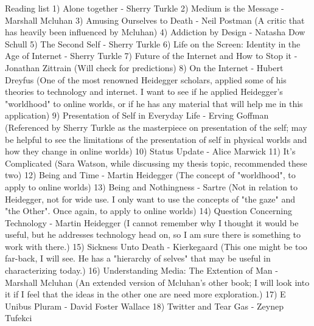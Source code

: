 Reading list
1) Alone together - Sherry Turkle
2) Medium is the Message - Marshall Mcluhan
3) Amusing Ourselves to Death - Neil Postman (A critic that has heavily been influenced by Mcluhan)
4) Addiction by Design - Natasha Dow Schull
5) The Second Self - Sherry Turkle
6) Life on the Screen: Identity in the Age of Internet - Sherry Turkle
7) Future of the Internet and How to Stop it - Jonathan Zittrain (Will check for predictions)
8) On the Internet - Hubert Dreyfus (One of the most renowned Heidegger scholars, applied some of his theories to technology and internet. 
I want to see if he applied Heidegger's "worldhood" to online worlds, or if he has any material that will help me in this application)
9) Presentation of Self in Everyday Life - Erving Goffman (Referenced by Sherry Turkle as the masterpiece on presentation of the self; may
be helpful to see the limitations of the presentation of self in physical worlds and how they change in online worlds)
10) Status Update - Alice Marwick
11) It's Complicated (Sara Watson, while discussing my thesis topic, recommended these two)
12) Being and Time - Martin Heidegger (The concept of "worldhood", to apply to online worlds)
13) Being and Nothingness - Sartre (Not in relation to Heidegger, not for wide use. I only want to use the concepts of "the gaze" and 
"the Other". Once again, to apply to online worlds)
14) Question Concerning Technology - Martin Heidegger (I cannot remember why I thought it would be useful, but he addresses technology head on,
so I am sure there is something to work with there.)
15) Sickness Unto Death - Kierkegaard (This one might be too far-back, I will see. He has a "hierarchy of selves" that may be useful in
characterizing today.)
16) Understanding Media: The Extention of Man - Marshall Mcluhan (An extended version of Mcluhan's other book; I will look into it if 
I feel that the ideas in the other one are need more exploration.)
17) E Unibus Pluram - David Foster Wallace
18) Twitter and Tear Gas - Zeynep Tufekci

